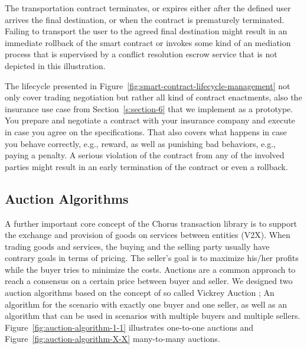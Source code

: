 \documentclass{llncs}
\begin{document}
{			The transportation contract terminates, or expires either after the defined user arrives the final destination, or when the contract is prematurely terminated. Failing to transport the user to the agreed final destination might result in an immediate rollback of the smart contract or invokes some kind of an mediation process that is supervised by a conflict resolution escrow service that is not depicted in this illustration.
	
			The lifecycle presented in Figure~\ref{fig:smart-contract-lifecycle-management} not only cover trading negotiation but rather all kind of contract enactments, also the insurance use case from Section~\ref{s:section-6} that we implement as a prototype. You prepare and negotiate a contract with your insurance company and execute in case you agree on the specifications. That also covers what happens in case you behave correctly, e.g., reward, as well as punishing bad behaviors, e.g., paying a penalty. A serious violation of the contract from any of the involved parties might result in an early termination of the contract or even a rollback.



		
		\subsection{Auction Algorithms}
			\label{ss:auchtion-algorithm}				

			A further important core concept of the Chorus transaction library is to support the exchange and provision of goods on services between entities (V2X). When trading goods and services, the buying and the selling party usually have contrary goals in terms of pricing. The seller's goal is to maximize his/her profits while the buyer tries to minimize the costs. Auctions are a common approach to reach a consensus on a certain price between buyer and seller. We designed two auction algorithms based on the concept of so called Vickrey Auction \cite{moldovanu1998goethe}\cite{vickrey1961counterspeculation}; An algorithm for the scenario with exactly one buyer and one seller, as well as an algorithm that can be used in scenarios with multiple buyers and multiple sellers. Figure~\ref{fig:auction-algorithm-1-1} illustrates one-to-one auctions and Figure~\ref{fig:auction-algorithm-X-X} many-to-many auctions.
			
}
\end{document}
